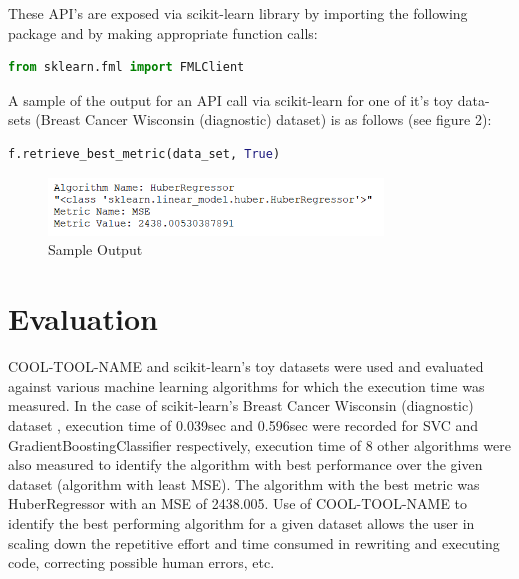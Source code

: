 \documentclass{article}
\begin{document}
These API's are exposed via scikit-learn library by importing the following package and by making appropriate function calls:
\begin{lstlisting}[language=python]
from sklearn.fml import FMLClient
\end{lstlisting}

A sample of the output for an API call via scikit-learn for one of it's toy data-sets (Breast Cancer Wisconsin (diagnostic) dataset) \cite{william-et-al} is as follows (see figure 2):
\begin{lstlisting}[language=python]
f.retrieve_best_metric(data_set, True)
\end{lstlisting}
\begin{figure}[h]
    \centering
    \includegraphics[width=3.5in]{sample-output.PNG}
    \caption{Sample Output}
    \label{sample-output}
\end{figure}


\section{Evaluation}
COOL-TOOL-NAME and scikit-learn's toy datasets were used and evaluated against various machine learning algorithms for which the execution time was measured. In the case of scikit-learn’s Breast Cancer Wisconsin (diagnostic) dataset \cite{william-et-al}, execution time of 0.039sec and 0.596sec were recorded for SVC and GradientBoostingClassifier respectively, execution time of 8 other algorithms were also measured to identify the algorithm with best performance over the given dataset (algorithm with least MSE). The algorithm with the best metric was HuberRegressor with an MSE of 2438.005. Use of COOL-TOOL-NAME to identify the best performing algorithm for a given dataset allows the user in scaling down the repetitive effort and time consumed in rewriting and executing code, correcting possible human errors, etc.
\end{document}
